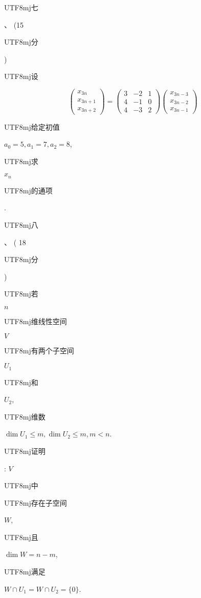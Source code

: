 \documentclass[10pt]{article}
\begin{document}
\begin{CJK}{UTF8}{mj}七\end{CJK}、 (15 \begin{CJK}{UTF8}{mj}分\end{CJK}) \begin{CJK}{UTF8}{mj}设\end{CJK}
$$
\left(\begin{array}{c}
x_{3 n} \\
x_{3 n+1} \\
x_{3 n+2}
\end{array}\right)=\left(\begin{array}{ccc}
3 & -2 & 1 \\
4 & -1 & 0 \\
4 & -3 & 2
\end{array}\right)\left(\begin{array}{l}
x_{3 n-3} \\
x_{3 n-2} \\
x_{3 n-1}
\end{array}\right)
$$
\begin{CJK}{UTF8}{mj}给定初值\end{CJK} $a_{0}=5, a_{1}=7, a_{2}=8$, \begin{CJK}{UTF8}{mj}求\end{CJK} $x_{n}$ \begin{CJK}{UTF8}{mj}的通项\end{CJK}.

\begin{CJK}{UTF8}{mj}八\end{CJK}、 ( 18 \begin{CJK}{UTF8}{mj}分\end{CJK}) \begin{CJK}{UTF8}{mj}若\end{CJK} $n$ \begin{CJK}{UTF8}{mj}维线性空间\end{CJK} $V$ \begin{CJK}{UTF8}{mj}有两个子空间\end{CJK} $U_{1}$ \begin{CJK}{UTF8}{mj}和\end{CJK} $U_{2}$, \begin{CJK}{UTF8}{mj}维数\end{CJK} $\operatorname{dim} U_{1} \leq m, \operatorname{dim} U_{2} \leq m, m<n$. \begin{CJK}{UTF8}{mj}证明\end{CJK}: $V$ \begin{CJK}{UTF8}{mj}中\end{CJK} \begin{CJK}{UTF8}{mj}存在子空间\end{CJK} $W$, \begin{CJK}{UTF8}{mj}且\end{CJK} $\operatorname{dim} W=n-m$, \begin{CJK}{UTF8}{mj}满足\end{CJK} $W \cap U_{1}=W \cap U_{2}=\{0\}$.
\end{document}
